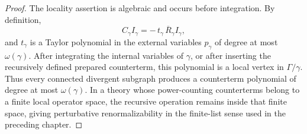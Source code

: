 \begin{proof}
The locality assertion is algebraic and occurs before integration.  By
definition,
\[
  C_\gamma I_\gamma
  =
  -\,t_\gamma\,\overline R_\gamma I_\gamma ,
\]
and \(t_\gamma\) is a Taylor polynomial in the external variables \(p_\gamma\)
of degree at most \(\omega(\gamma)\).  After integrating the internal
variables of \(\gamma\), or after inserting the recursively defined prepared
counterterm, this polynomial is a local vertex in \(\Gamma/\gamma\).  Thus
every connected divergent subgraph produces a counterterm polynomial of degree
at most \(\omega(\gamma)\).  In a theory whose power-counting counterterms
belong to a finite local operator space, the recursive operation remains
inside that finite space, giving perturbative renormalizability in the
finite-list sense used in the preceding chapter.
\end{proof}

